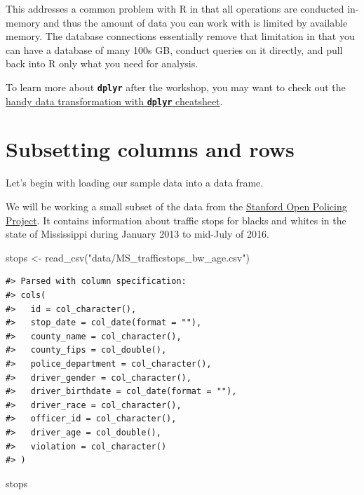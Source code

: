 \documentclass[
]{book}
\newenvironment{Shaded}{\begin{snugshade}}{\end{snugshade}}
\newcommand{\FunctionTok}[1]{\textcolor[rgb]{0.00,0.00,0.00}{#1}}
\newcommand{\NormalTok}[1]{#1}
\newcommand{\OtherTok}[1]{\textcolor[rgb]{0.56,0.35,0.01}{#1}}
\newcommand{\StringTok}[1]{\textcolor[rgb]{0.31,0.60,0.02}{#1}}
\begin{document}
This addresses a common problem with R in that all operations are conducted
in-memory and thus the amount of data you can work with is limited by available
memory. The database connections essentially remove that limitation in that you
can have a database of many 100s GB, conduct queries on it directly, and pull
back into R only what you need for analysis.

To learn more about \textbf{\texttt{dplyr}} after the workshop, you may want to check out the \href{https://github.com/rstudio/cheatsheets/raw/master/data-transformation.pdf}{handy data transformation with \textbf{\texttt{dplyr}} cheatsheet}.

\hypertarget{subsetting-columns-and-rows}{%
\section{Subsetting columns and rows}\label{subsetting-columns-and-rows}}

Let's begin with loading our sample data into a data frame.

We will be working a small subset of the data from the \href{https://openpolicing.stanford.edu}{Stanford Open Policing Project}. It contains information about traffic stops for blacks and whites in the state of Mississippi during January 2013 to mid-July of 2016.

\begin{Shaded}
\begin{Highlighting}[]
\NormalTok{stops }\OtherTok{\textless{}{-}} \FunctionTok{read\_csv}\NormalTok{(}\StringTok{"data/MS\_trafficstops\_bw\_age.csv"}\NormalTok{)}
\end{Highlighting}
\end{Shaded}

\begin{verbatim}
#> Parsed with column specification:
#> cols(
#>   id = col_character(),
#>   stop_date = col_date(format = ""),
#>   county_name = col_character(),
#>   county_fips = col_double(),
#>   police_department = col_character(),
#>   driver_gender = col_character(),
#>   driver_birthdate = col_date(format = ""),
#>   driver_race = col_character(),
#>   officer_id = col_character(),
#>   driver_age = col_double(),
#>   violation = col_character()
#> )
\end{verbatim}

\begin{Shaded}
\begin{Highlighting}[]
\NormalTok{stops}
\end{Highlighting}
\end{Shaded}
\end{document}
